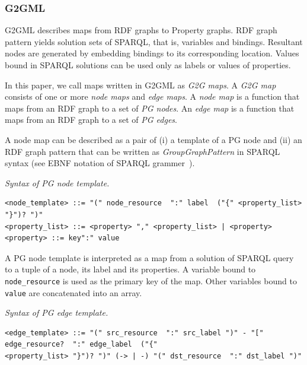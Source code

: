 \documentclass[runningheads]{llncs}
\begin{document}
\subsubsection{G2GML}
G2GML describes maps from RDF graphs to Property graphs.
RDF graph pattern yields solution sets of SPARQL, that is, variables and bindings.
Resultant nodes are generated by embedding bindings to its corresponding location.
Values bound in SPARQL solutions can be used only as labels or values of properties.

In this paper, we call maps written in G2GML as \textit{G2G maps}.
A \textit{G2G map} consists of one or more \textit{node maps} and \textit{edge maps}.
A \textit{node map} is a function that maps from an RDF graph to a set of \textit{PG nodes}. 
An \textit{edge map} is a function that maps from an RDF graph to a set of \textit{PG edges}.

A node map can be described as a pair of (i) a template of a PG node and (ii) an RDF graph pattern that can be written as \textit{GroupGraphPattern} in SPARQL syntax (see EBNF notation of SPARQL grammer~\cite{sparql}).

\begin{defi}
\emph{Syntax of PG node template.}
\begin{scriptsize}
\begin{verbatim}
<node_template> ::= "(" node_resource  ":" label  ("{" <property_list> "}")? ")"
<property_list> ::= <property> "," <property_list> | <property>
<property> ::= key":" value
\end{verbatim}
\end{scriptsize}
\end{defi}

A PG node template is interpreted as a map from a solution of SPARQL query to a tuple of a node, its label and its properties.  A variable bound to \texttt{node\_resource} is used as the primary key of the map. Other variables bound to \texttt{value} are concatenated into an array. 


\begin{defi}
\emph{Syntax of PG edge template.}
\begin{scriptsize}
\begin{verbatim}
<edge_template> ::= "(" src_resource  ":" src_label ")" - "[" edge_resource?  ":" edge_label  ("{" 
<property_list> "}")? ")" (-> | -) "(" dst_resource  ":" dst_label ")"
\end{verbatim}
\end{scriptsize}
\end{defi}
\end{document}
